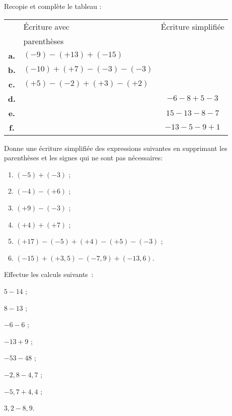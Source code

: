 \begin{exercice}
Recopie et complète le tableau :
\begin{center}
\begin{tabularx}{0.98\linewidth}{|c|X|c|}

\hline
 & Écriture avec & Écriture simplifiée \\ 
  & parenthèses &  \\ \hline

\textbf{a.} & \footnotesize{$(-9) - (+13) + (-15)$} & \\ \hline
\textbf{b.} & \footnotesize{$(-10) + (+7) - (-3) - (-3)$} & \\ \hline
\textbf{c.} & \footnotesize{$(+5) - (-2) + (+3) - (+2)$} & \\ \hline
\textbf{d.} & & \footnotesize{$-6 - 8 + 5 - 3$} \\ \hline
\textbf{e.} & & \footnotesize{$15 - 13 - 8 - 7$} \\ \hline
\textbf{f.} & & \footnotesize{$-13 - 5 - 9 + 1$} \\ \hline
 \end{tabularx}
 \end{center}
\end{exercice}


\begin{exercice}
Donne une écriture simplifiée des expressions suivantes en supprimant les parenthèses et les signes qui ne sont pas nécessaires:
\begin{enumerate}
 \item $(-5) + (-3)$ ;
 \item $(-4) - (+6)$ ;
 \item $(+9) - (-3)$ ;
 \item $(+4) + (+7)$ ;
  \item $(+17) - (-5) + (+4) - (+5) - (-3)$ ;
  \item $(-15) + (+3,5) - (-7,9) + (-13,6)$.
  \end{enumerate}
\end{exercice}


\begin{exercice}
Effectue les calculs suivants :
\begin{colenumerate}{2}
 \item $5 - 14$ ;
 \item $8 - 13$ ;
 \item $-6 - 6$ ;
 \item $-13 + 9$ ;
 \item $-53 - 48$ ;
 \item $-2,8 - 4,7$ ;
 \item $-5,7 + 4,4$ ;
 \item $3,2 - 8,9$.
 \end{colenumerate}
\end{exercice}


